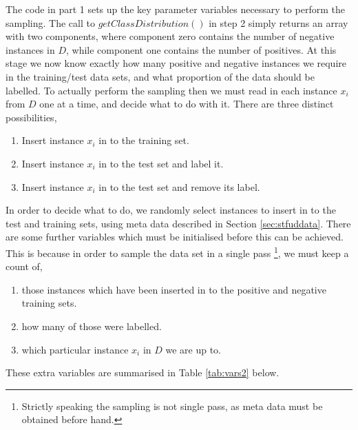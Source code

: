 \documentclass[twoside,a4paper]{refart}
\begin{document}
The code in part 1 sets up the key parameter variables necessary to perform the sampling. The call to $getClassDistribution()$ in step 2 simply returns an array with two components, where component zero contains the number of negative instances in $D$, while component one contains the number of positives. At this stage we now know exactly how many positive and negative instances we require in the training/test data sets, and what proportion of the data should be labelled. To actually perform the sampling then we must read in each instance $x_{i}$ from $D$ one at a time, and decide what to do with it. There are three distinct possibilities,
\begin{enumerate}
 \item Insert instance $x_{i}$ in to the training set.
 \item Insert instance $x_{i}$ in to the test set and label it.
 \item Insert instance $x_{i}$ in to the test set and remove its label.
 \end{enumerate} 
In order to decide what to do, we randomly select instances to insert in to the test and training sets, using meta data described in Section \ref{sec:stfuddata}.  There are some further variables which must be initialised before this can be achieved. This is because in order to sample the data set in a single pass \footnote{Strictly speaking the sampling is not single pass, as meta data must be obtained before hand.}, we must keep a count of,
\begin{enumerate}
\item those instances which have been inserted in to the positive and negative training sets.
\item how many of those were labelled.
\item which particular instance $x_{i}$ in $D$ we are up to.
\end{enumerate}
\newpage
These extra variables are summarised in Table \ref{tab:vars2} below.
\end{document}
